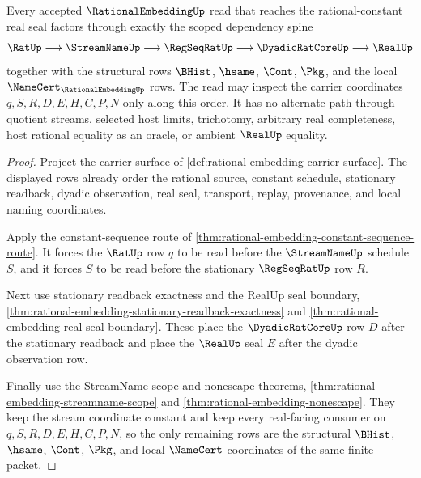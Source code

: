 \begin{theorem}
\label{thm:rational-embedding-scoped-dependency-spine}
Every accepted $\RationalEmbeddingUp$ read that reaches the rational-constant real seal factors through exactly the scoped dependency spine
$$
\RatUp \longrightarrow \StreamNameUp \longrightarrow \RegSeqRatUp \longrightarrow \DyadicRatCoreUp \longrightarrow \RealUp
$$
together with the structural rows $\BHist$, $\hsame$, $\Cont$, $\Pkg$, and the local $\NameCert_{\RationalEmbeddingUp}$ rows. The read may inspect the carrier coordinates $q,S,R,D,E,H,C,P,N$ only along this order. It has no alternate path through quotient streams, selected host limits, trichotomy, arbitrary real completeness, host rational equality as an oracle, or ambient $\RealUp$ equality.
\end{theorem}
\begin{proof}
Project the carrier surface of \autoref{def:rational-embedding-carrier-surface}. The displayed rows already order the rational source, constant schedule, stationary readback, dyadic observation, real seal, transport, replay, provenance, and local naming coordinates.

Apply the constant-sequence route of \autoref{thm:rational-embedding-constant-sequence-route}. It forces the $\RatUp$ row $q$ to be read before the $\StreamNameUp$ schedule $S$, and it forces $S$ to be read before the stationary $\RegSeqRatUp$ row $R$.

Next use stationary readback exactness and the RealUp seal boundary, \autoref{thm:rational-embedding-stationary-readback-exactness} and \autoref{thm:rational-embedding-real-seal-boundary}. These place the $\DyadicRatCoreUp$ row $D$ after the stationary readback and place the $\RealUp$ seal $E$ after the dyadic observation row.

Finally use the StreamName scope and nonescape theorems, \autoref{thm:rational-embedding-streamname-scope} and \autoref{thm:rational-embedding-nonescape}. They keep the stream coordinate constant and keep every real-facing consumer on $q,S,R,D,E,H,C,P,N$, so the only remaining rows are the structural $\BHist$, $\hsame$, $\Cont$, $\Pkg$, and local $\NameCert$ coordinates of the same finite packet.
\end{proof}

